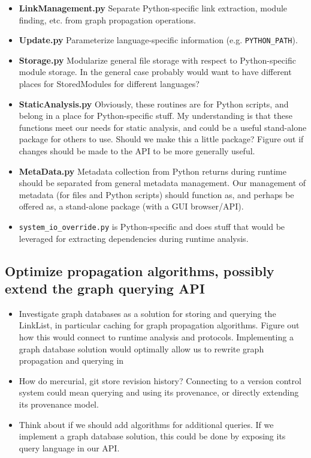 \documentclass[11pt]{article}
\begin{document}
\begin{itemize}

	\item{\textbf{LinkManagement.py} Separate Python-specific link extraction, module finding, etc. 
	from graph propagation operations.}
	
	\item{\textbf{Update.py} Parameterize language-specific information (e.g. \verb|PYTHON_PATH|).}

	\item{\textbf{Storage.py} Modularize general file storage with respect to Python-specific module 
	storage. In the general case probably would want to have different places for StoredModules for 
	different languages?}

	\item{\textbf{StaticAnalysis.py} Obviously, these routines are for Python scripts, and belong in 
	a place for Python-specific stuff.  My understanding is that these functions meet our needs for 
	static analysis, and could be a useful stand-alone package for others to use.  Should we make 
	this a little package?  Figure out if changes should be made to the API to be more generally 
	useful.}

	\item{\textbf{MetaData.py} Metadata collection from Python returns during runtime should be 
	separated from general metadata management.  Our management of metadata (for files and Python 
	scripts) should function as, and perhaps be offered as, a stand-alone package (with a GUI
	browser/API).}
	
	\item{\verb|system_io_override.py| is Python-specific and does stuff that would be leveraged
	for extracting dependencies during runtime analysis.}

\end{itemize}

\subsection{Optimize propagation algorithms, possibly extend the graph querying API}

\begin{itemize}

	\item{Investigate graph databases as a solution for storing and querying the LinkList, in 
	particular caching for graph propagation algorithms. Figure out how this would connect to 
	runtime analysis and protocols.  Implementing a graph database solution would optimally allow
	us to rewrite graph propagation and querying in }
	
	\item{How do mercurial, git store revision history?  Connecting to a version control system
	could mean querying and using its provenance, or directly extending its provenance model.}
	
	\item{Think about if we should add algorithms for additional queries.  If we implement a graph
	database solution, this could be done by exposing its query language in our API.}
	
\end{itemize}
\end{document}
